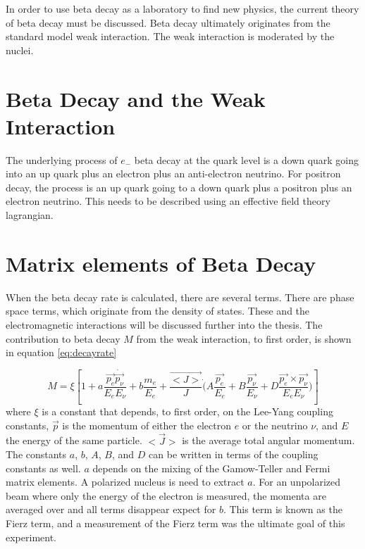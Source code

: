\documentclass[main.tex]{subfiles}
\begin{document}
In order to use beta decay as a laboratory to find new physics, the current theory of beta decay must be discussed.
Beta decay ultimately originates from the standard model weak interaction.
The weak interaction is moderated by the nuclei.

\section{Beta Decay and the Weak Interaction}
The underlying process of $e_{-}$ beta decay at the quark level is a down quark going into an up quark plus an electron plus an anti-electron neutrino.
For positron decay, the process is an up quark going to a down quark plus a positron plus an electron neutrino. 
This needs to be described using an effective field theory lagrangian. 

\section{Matrix elements of Beta Decay}
When the beta decay rate is calculated, there are several terms.
There are phase space terms, which originate from the density of states.
These and the electromagnetic interactions will be discussed further into the thesis. 
The contribution to beta decay $M$ from the weak interaction, to first order, is shown in equation \ref{eq:decayrate} \cite{ref:oscarpaper}

\begin{equation}
	M = \xi [1 + a \frac{\vec{p_{e}} \dot \vec{p_{\nu}}} {E_{e} E_{\nu}}  +  b \frac{m_{e}}{E_{e}} + \frac{\vec{<J>}}{J} \dot (A \frac{ \vec{p_{e}} }{E_{e}} + B \frac{\vec{p_{\nu}}}{E_{\nu}} + D \frac{\vec{p_{e}} \times \vec{p_{\nu}}}{E_{e} E_{\nu}})]
	\label{eq:decayrate}
\end{equation}
where $\xi$ is a constant that depends, to first order, on the Lee-Yang coupling constants, $\vec{p}$  is the momentum of either the electron $e$ or the neutrino $\nu$, and $E$ the energy of the same particle.
$<\vec{J}>$ is the average total angular momentum. 
The constants $a$, $b$, $A$, $B$, and $D$ can be written in terms of the coupling constants as well.
$a$ depends on the mixing of the Gamow-Teller and Fermi matrix elements.
A polarized nucleus is need to extract $a$. 
For an unpolarized beam where only the energy of the electron is measured, the momenta are averaged over and all terms disappear expect for $b$.
This term is known as the Fierz term, and a measurement of the Fierz term was the ultimate goal of this experiment. 
\end{document}
